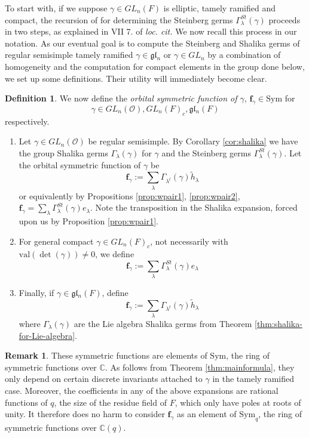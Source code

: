 \documentclass{amsart}
\numberwithin{equation}{section}
\theoremstyle{definition}
\newtheorem{remark}[lemma]{Remark}%
\newtheorem{definition}[lemma]{Definition}%
\def\val{\mathrm{val}}
\def\tilde{\widetilde}
\def\Sym{{\mathrm{Sym}}}
\renewcommand{\th}{\tilde{h}}
\newcommand{\fgamma}{\mathbf{f}_{\gamma}}
\newcommand{\cO}{\mathcal{O}}
\newcommand{\fl}{\mathfrak{l}}
\newcommand{\fg}{\mathfrak{g}}
\newcommand{\C}{{\mathbb C}}
\begin{document}
To start with, if we suppose $\gamma\in GL_n(F)$ is elliptic, tamely ramified and compact, the recursion of \cite{W2} for determining the Steinberg germs $\Gamma_\lambda^{St}(\gamma)$ proceeds in two steps, as explained in VII 7. of {\em loc. cit.} We now recall this process in our notation. As our eventual goal is to compute the Steinberg and Shalika germs of regular semisimple tamely ramified $\gamma\in \fg\fl_n$ or $\gamma\in GL_n$ by a combination of homogeneity and the computation for compact elements in the group done below, we set up some definitions. Their utility will immediately become clear.

\begin{definition}
\label{def:ellipticmastersymfn}
We now define the {\em orbital symmetric function of $\gamma$}, $\fgamma\in \Sym$ for $$\gamma\in GL_n(\cO), GL_n(F)_c, \fg\fl_n(F)$$ respectively. 
\begin{enumerate}
\item  Let $\gamma\in GL_n(\cO)$ be regular semisimple. By Corollary \ref{cor:shalika} we have the group Shalika germs $\Gamma_\lambda(\gamma)$ for $\gamma$ and the Steinberg germs $\Gamma^{St}_\lambda(\gamma)$. Let the orbital symmetric function of $\gamma$ be 
$$\fgamma:=\sum_\lambda \Gamma_{\lambda^t}(\gamma)\th_\lambda$$ or equivalently by Propositions \ref{prop:wpair1}, \ref{prop:wpair2},
$\fgamma=\sum_\lambda \Gamma^{St}_\lambda(\gamma)e_\lambda$. Note the transposition in the Shalika expansion, forced upon us by Proposition \ref{prop:wpair1}.
\item For general compact $\gamma\in GL_n(F)_c$, not necessarily with $\val(\det(\gamma))\not=0$, we define 
$$\fgamma:=\sum_\lambda \Gamma^{St}_\lambda(\gamma)e_\lambda$$
\item Finally, if $\gamma\in \fg\fl_n(F)$, define $$\fgamma:=\sum_\lambda \Gamma_{\lambda^t}(\gamma)\th_\lambda$$ where $\Gamma_\lambda(\gamma)$ are the Lie algebra Shalika germs from Theorem \ref{thm:shalika-for-Lie-algebra}.
\end{enumerate}
\end{definition}
\begin{remark}
\label{rem:sizeofresfield}
    These symmetric functions are elements of $\Sym$, the ring of symmetric functions over $\C$. As follows from Theorem \ref{thm:mainformula}, they only depend on certain discrete invariants attached to $\gamma$ in the tamely ramified case. Moreover, the coefficients in any of the above expansions are rational functions of $q$, the size of the residue field of $F$, which only have poles at roots of unity. It therefore does no harm to consider $\fgamma$ as an element of $\Sym_q$, the ring of symmetric functions over $\C(q)$. 
\end{remark}
\end{document}
